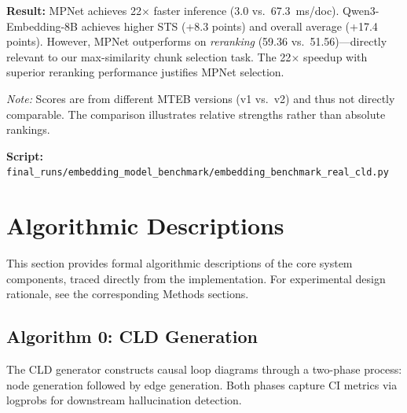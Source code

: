 \textbf{Result:} MPNet achieves 22$\times$ faster inference (3.0 vs.\ 67.3~ms/doc). Qwen3-Embedding-8B achieves higher STS (+8.3 points) and overall average (+17.4 points). However, MPNet outperforms on \textit{reranking} (59.36 vs.\ 51.56)---directly relevant to our max-similarity chunk selection task. The 22$\times$ speedup with superior reranking performance justifies MPNet selection.

\textit{Note:} Scores are from different MTEB versions (v1 vs.\ v2) and thus not directly comparable. The comparison illustrates relative strengths rather than absolute rankings.

\textbf{Script:} \texttt{final\_runs/embedding\_model\_benchmark/embedding\_benchmark\_real\_cld.py}

\section{Algorithmic Descriptions}
\label{sec:algorithms}

This section provides formal algorithmic descriptions of the core system components, traced directly from the implementation. For experimental design rationale, see the corresponding Methods sections.

\subsection{Algorithm 0: CLD Generation}
\label{alg:cld_generation}

The CLD generator constructs causal loop diagrams through a two-phase process: node generation followed by edge generation. Both phases capture CI metrics via logprobs for downstream hallucination detection.

